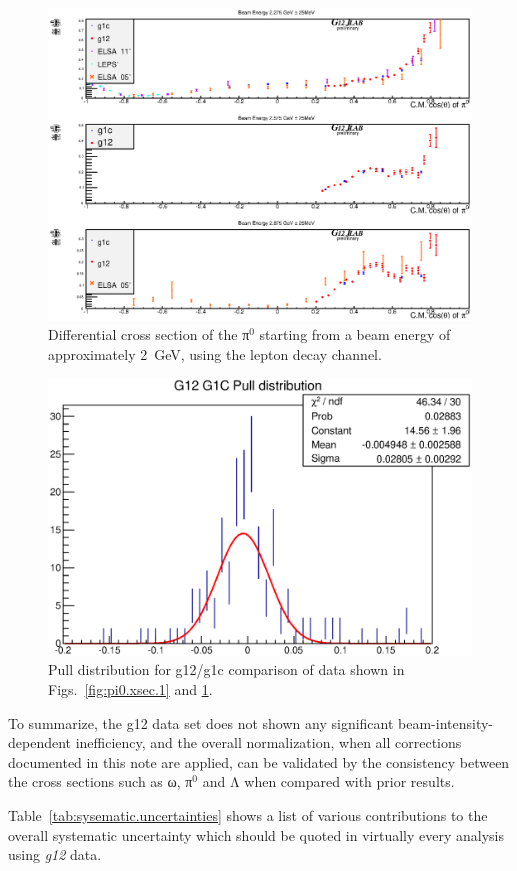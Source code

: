 \begin{figure}[htpb]\begin{center}
\includegraphics[width=0.95\columnwidth]{figures/xsec/G12_Pi0_XSection_forAnalysisNote_II.eps}
\caption{\label{fig:pi0.xsec.2}Differential cross section of the π$^0$ starting from a beam energy of approximately 2~GeV, using the lepton decay channel.}
\end{center}\end{figure}

\begin{figure}[htpb]\begin{center}
\includegraphics[width=0.7\columnwidth]{figures/xsec/G12_Pi0_XSection_pull.eps}
\caption{\label{fig:pi0.xsec.pull}Pull distribution for g12/g1c comparison of data shown in Figs.~\ref{fig:pi0.xsec.1} and \ref{fig:pi0.xsec.2}.}
\end{center}\end{figure}

To summarize, the g12 data set does not shown any significant beam-intensity-dependent inefficiency, and the overall normalization, when all corrections documented in this note are applied, can be validated by the consistency between the cross sections such as ω, π$^0$ and Λ when compared with prior results. \begin{v2}Table~\ref{tab:sysematic.uncertainties} shows a list of various contributions to the overall systematic uncertainty which should be quoted in virtually every analysis using \emph{g12} data.\end{v2}


